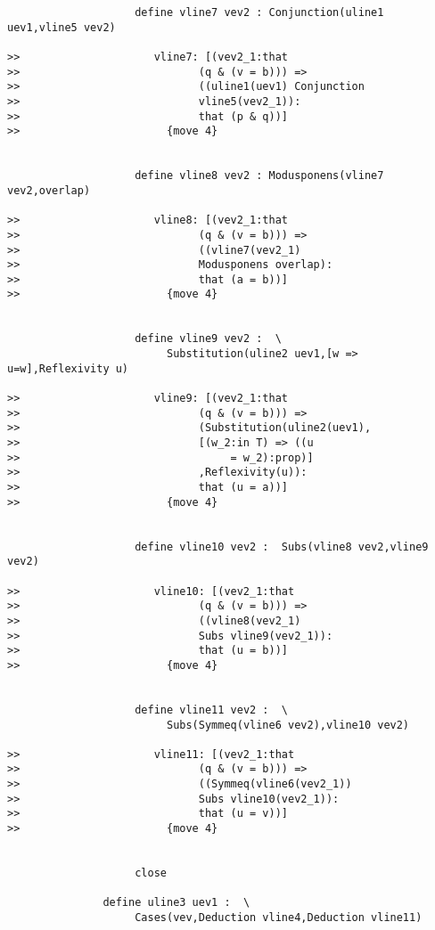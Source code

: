 \documentclass[12pt]{article}
\begin{document}
\begin{verbatim}
                    define vline7 vev2 : Conjunction(uline1 uev1,vline5 vev2)

>>                     vline7: [(vev2_1:that 
>>                            (q & (v = b))) => 
>>                            ((uline1(uev1) Conjunction 
>>                            vline5(vev2_1)):
>>                            that (p & q))]
>>                       {move 4}


                    define vline8 vev2 : Modusponens(vline7 vev2,overlap)

>>                     vline8: [(vev2_1:that 
>>                            (q & (v = b))) => 
>>                            ((vline7(vev2_1) 
>>                            Modusponens overlap):
>>                            that (a = b))]
>>                       {move 4}


                    define vline9 vev2 :  \
                         Substitution(uline2 uev1,[w => u=w],Reflexivity u)

>>                     vline9: [(vev2_1:that 
>>                            (q & (v = b))) => 
>>                            (Substitution(uline2(uev1),
>>                            [(w_2:in T) => ((u 
>>                                 = w_2):prop)]
>>                            ,Reflexivity(u)):
>>                            that (u = a))]
>>                       {move 4}


                    define vline10 vev2 :  Subs(vline8 vev2,vline9 vev2)

>>                     vline10: [(vev2_1:that 
>>                            (q & (v = b))) => 
>>                            ((vline8(vev2_1) 
>>                            Subs vline9(vev2_1)):
>>                            that (u = b))]
>>                       {move 4}


                    define vline11 vev2 :  \
                         Subs(Symmeq(vline6 vev2),vline10 vev2)

>>                     vline11: [(vev2_1:that 
>>                            (q & (v = b))) => 
>>                            ((Symmeq(vline6(vev2_1)) 
>>                            Subs vline10(vev2_1)):
>>                            that (u = v))]
>>                       {move 4}


                    close

               define uline3 uev1 :  \
                    Cases(vev,Deduction vline4,Deduction vline11)


\end{verbatim}
\end{document}
